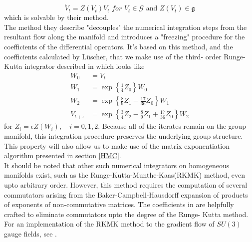 \documentclass[a4paper,10pt]{article}
\begin{document}
\begin{equation}
\dot{V}_{t}=Z\left(V_{t}\right) V_{t}\,\,for\,\,V_{t} \in \mathcal{G} \text { and } Z\left(V_{t}\right) \in \mathfrak{g}
\end{equation}
which is solvable by their method.\\The method they describe "decouples" the numerical integration steps from the resultant flow along the manifold and introduces a "freezing" procedure for the coefficients of the differential operators. It's based on this method, and the coefficients calculated by Lüscher, that we make use of the third- order Runge-Kutta integrator described in \cite{Luscher2010} which looks like
\begin{equation}
\begin{aligned}
W_{0} &=V_{t} \\
W_{1} &=\exp \left\{\frac{1}{4} Z_{0}\right\} W_{0} \\
W_{2} &=\exp \left\{\frac{8}{9} Z_{1}-\frac{17}{36} Z_{0}\right\} W_{1} \\
V_{t+\epsilon} &=\exp \left\{\frac{3}{4} Z_{2}-\frac{8}{9} Z_{1}+\frac{17}{36} Z_{0}\right\} W_{2}
\end{aligned}
\end{equation}
for $Z_{i}=\epsilon Z\left(W_{i}\right), \quad i=0,1,2$.
Because all of the iterates remain on the group manifold, this integration procedure preserves the underlying group structure. This property will also allow us to make use of the matrix exponentiation algorithm presented in section \ref{HMC}.\\It should be noted that other such numerical integrators on homogeneous manifolds exist, such as the Runge-Kutta-Munthe-Kaas(RKMK) method, even upto arbitrary order. However, this method requires the computation of several commutators arising from the Baker-Campbell-Hausdorff expansion of products of exponents of non-commutative matrices. The coefficients in \cite{Luscher2010} are helpfully crafted to eliminate commutators upto the degree of the Runge- Kutta method. For an implementation of the RKMK method to the gradient flow of $SU(3)$ gauge fields, see \cite{non_gaussianities2015}.
\end{document}

